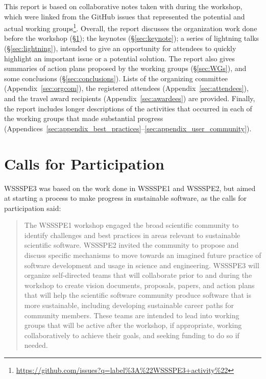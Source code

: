 \documentclass[11pt, oneside]{amsart}
\begin{document}
This report is based on collaborative notes taken with during the workshop,
which were linked from the GitHub issues that represented the potential and
actual working
groups\footnote{\url{https://github.com/issues?q=label\%3A\%22WSSSPE3+activity\%22}}.
Overall, the report discusses the organization work done before the workshop
(\S\ref{sec:preworkshop}); the keynotes (\S\ref{sec:keynote}); a series of
lightning talks (\S\ref{sec:lightning}), intended to give an opportunity for
attendees to quickly highlight an important issue or a potential solution. The
report also gives summaries of action plans proposed by the working
groups (\S\ref{sec:WGs}), and some conclusions (\S\ref{sec:conclusions}).
Lists of the organizing committee (Appendix~\ref{sec:orgcom}), the registered
attendees (Appendix~\ref{sec:attendees}), and the travel award recipients
(Appendix~\ref{sec:awardees}) are provided. Finally, the report includes longer
descriptions of the activities that
occurred in each of the working groups that made substantial progress 
(Appendices~\ref{sec:appendix_best_practices}--\ref{sec:appendix_user_community}).

\section{Calls for Participation} \label{sec:preworkshop}

WSSSPE3 was based on the work done in WSSSPE1 and WSSSPE2, but aimed at starting
a process to make progress in sustainable software, as the calls for
participation said:

\begin{quote} The WSSSPE1 workshop engaged the broad scientific community to
identify challenges and best practices in areas relevant to sustainable
scientific software. WSSSPE2 invited the community to propose and discuss
specific mechanisms to move towards an imagined future practice of software
development and usage in science and engineering. WSSSPE3 will organize
self-directed teams that will collaborate prior to and during the workshop to
create vision documents, proposals, papers, and action plans that will help the
scientific software community produce software that is more sustainable,
including developing sustainable career paths for community members. These teams
are intended to lead into working groups that will be active after the workshop,
if appropriate, working collaboratively to achieve their goals, and seeking
funding to do so if needed. \end{quote}
\end{document}
